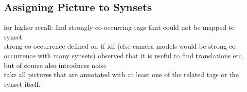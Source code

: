 \subsection{Assigning Picture to Synsets}
for higher recall: find strongly co-occurring tags that could not be mapped to synset \\
strong co-occurrence defined on tf-idf (else camera models would be strong co-occurrence with many synsets)
observed that it is useful to find translations etc. but of course also introduces noise \\
take all pictures that are annotated with at least one of the related tags or the synset itself.